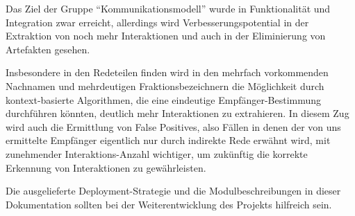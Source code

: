 Das Ziel der Gruppe \enquote{Kommunikationsmodell} wurde in Funktionalität und
Integration zwar erreicht, allerdings wird Verbesserungspotential
in der Extraktion von noch mehr Interaktionen und auch in der Eliminierung von
Artefakten gesehen.

Insbesondere in den Redeteilen finden wird in den mehrfach vorkommenden Nachnamen und
mehrdeutigen Fraktionsbezeichnern die Möglichkeit durch kontext-basierte Algorithmen, die
eine eindeutige Empfänger-Bestimmung durchführen könnten, deutlich mehr Interaktionen zu
extrahieren. In diesem Zug wird auch die Ermittlung von False Positives, also Fällen in
denen der von uns ermittelte Empfänger eigentlich nur durch indirekte Rede erwähnt wird,
mit zunehmender Interaktions-Anzahl wichtiger, um zukünftig die korrekte Erkennung von
Interaktionen zu gewährleisten.

Die ausgelieferte Deployment-Strategie und die Modulbeschreibungen in dieser
Dokumentation sollten bei der Weiterentwicklung des Projekts hilfreich sein.